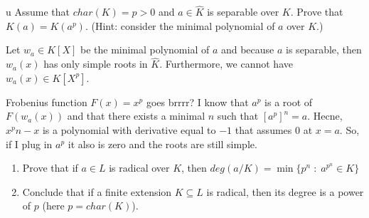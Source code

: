 \documentclass{article}
\begin{document}
%
%

\begin{problem}[7]{u}
Assume that $char(K)=p>0$ and $a\in \hat{K}$ is separable over $K$. Prove that $K(a)=K(a^p)$. (Hint: consider the minimal polynomial of $a$ over $K$.)
\end{problem}

Let $w_a\in K[X]$ be the minimal polynomial of $a$ and because $a$ is separable, then $w_a(x)$ has only simple roots in $\hat{K}$. Furthermore, we cannot have $w_a(x)\in K[X^p]$.

Frobenius function $F(x)=x^p$ goes brrrr? I know that $a^p$ is a root of $F(w_a(x))$ and that there exists a minimal $n$ such that $[a^p]^n=a$. Hecne, $x^pn-x$ is a polynomial with derivative equal to $-1$ that assumes $0$ at $x=a$. So, if I plug in $a^p$ it also is zero and the roots are still simple.






\begin{problem}[8]{}
\begin{enumerate}[label=(\alph*)]
    \item Prove that if $a\in L$ is radical over $K$, then $deg(a/K)=\min\{p^n\;:\;a^{p^n}\in K\}$
    \item Conclude that if a finite extension $K\subseteq L$ is radical, then its degree is a power of $p$ (here $p=char(K)$).
\end{enumerate}
\end{problem}
\end{document}
